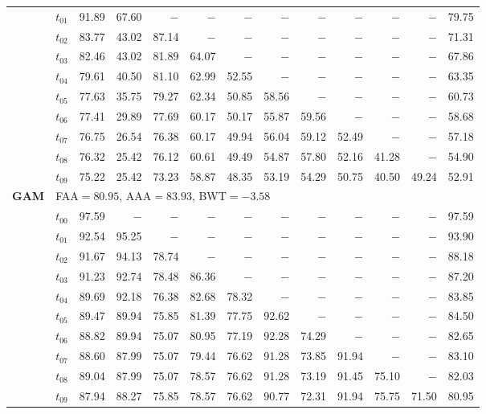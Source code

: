 \begin{table}[ht]
\begin{tabular}{@{}l l r r r r r r r r r r r@{}}
 & $t_{01}$ & 91.89 & 67.60 & $-$ & $-$ & $-$ & $-$ & $-$ & $-$ & $-$ & $-$ & 79.75 \\
 & $t_{02}$ & 83.77 & 43.02 & 87.14 & $-$ & $-$ & $-$ & $-$ & $-$ & $-$ & $-$ & 71.31 \\
 & $t_{03}$ & 82.46 & 43.02 & 81.89 & 64.07 & $-$ & $-$ & $-$ & $-$ & $-$ & $-$ & 67.86 \\
 & $t_{04}$ & 79.61 & 40.50 & 81.10 & 62.99 & 52.55 & $-$ & $-$ & $-$ & $-$ & $-$ & 63.35 \\
 & $t_{05}$ & 77.63 & 35.75 & 79.27 & 62.34 & 50.85 & 58.56 & $-$ & $-$ & $-$ & $-$ & 60.73 \\
 & $t_{06}$ & 77.41 & 29.89 & 77.69 & 60.17 & 50.17 & 55.87 & 59.56 & $-$ & $-$ & $-$ & 58.68 \\
 & $t_{07}$ & 76.75 & 26.54 & 76.38 & 60.17 & 49.94 & 56.04 & 59.12 & 52.49 & $-$ & $-$ & 57.18 \\
 & $t_{08}$ & 76.32 & 25.42 & 76.12 & 60.61 & 49.49 & 54.87 & 57.80 & 52.16 & 41.28 & $-$ & 54.90 \\
 & $t_{09}$ & 75.22 & 25.42 & 73.23 & 58.87 & 48.35 & 53.19 & 54.29 & 50.75 & 40.50 & 49.24 & 52.91 \\
\midrule
\multirow{11}{*}{\textbf{GAM}} & \multicolumn{12}{l}{\quad\small FAA$=80.95$,\; AAA$=83.93$,\; BWT$=-3.58$} \\
 & $t_{00}$ & 97.59 & $-$ & $-$ & $-$ & $-$ & $-$ & $-$ & $-$ & $-$ & $-$ & 97.59 \\
 & $t_{01}$ & 92.54 & 95.25 & $-$ & $-$ & $-$ & $-$ & $-$ & $-$ & $-$ & $-$ & 93.90 \\
 & $t_{02}$ & 91.67 & 94.13 & 78.74 & $-$ & $-$ & $-$ & $-$ & $-$ & $-$ & $-$ & 88.18 \\
 & $t_{03}$ & 91.23 & 92.74 & 78.48 & 86.36 & $-$ & $-$ & $-$ & $-$ & $-$ & $-$ & 87.20 \\
 & $t_{04}$ & 89.69 & 92.18 & 76.38 & 82.68 & 78.32 & $-$ & $-$ & $-$ & $-$ & $-$ & 83.85 \\
 & $t_{05}$ & 89.47 & 89.94 & 75.85 & 81.39 & 77.75 & 92.62 & $-$ & $-$ & $-$ & $-$ & 84.50 \\
 & $t_{06}$ & 88.82 & 89.94 & 75.07 & 80.95 & 77.19 & 92.28 & 74.29 & $-$ & $-$ & $-$ & 82.65 \\
 & $t_{07}$ & 88.60 & 87.99 & 75.07 & 79.44 & 76.62 & 91.28 & 73.85 & 91.94 & $-$ & $-$ & 83.10 \\
 & $t_{08}$ & 89.04 & 87.99 & 75.07 & 78.57 & 76.62 & 91.28 & 73.19 & 91.45 & 75.10 & $-$ & 82.03 \\
 & $t_{09}$ & 87.94 & 88.27 & 75.85 & 78.57 & 76.62 & 90.77 & 72.31 & 91.94 & 75.75 & 71.50 & 80.95 \\

\end{tabular}
\end{table}
